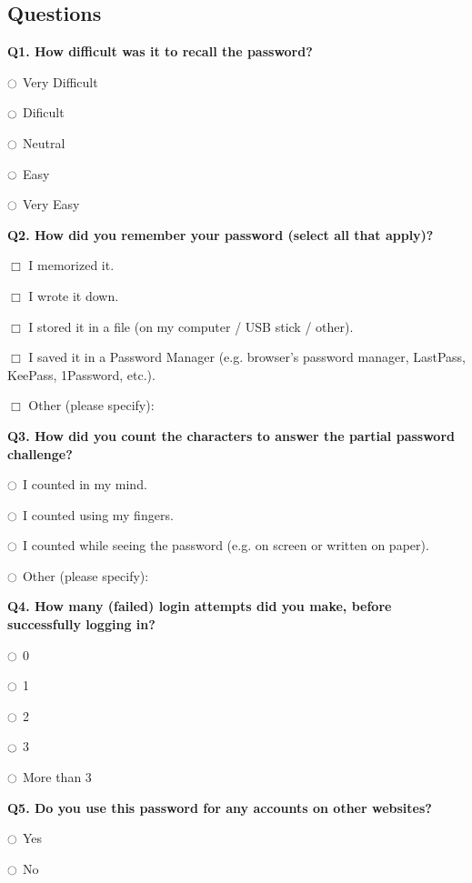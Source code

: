     \subsection{Questions}
    \label{apss:memorability_questions}
    {\setmainfont[Mapping=TeX-text,Ligatures=TeX]{Helvetica}
    \textbf{Q1. How difficult was it to recall the password?}
    \begin{shortitemize}
      \item[$\ocircle$] Very Difficult
      \item[$\ocircle$] Dificult
      \item[$\ocircle$] Neutral
      \item[$\ocircle$] Easy
      \item[$\ocircle$] Very Easy
    \end{shortitemize}

    \textbf{Q2. How did you remember your password (select all that apply)?}
    \begin{shortitemize}
      \item[$\Box$] I memorized it.
      \item[$\Box$] I wrote it down.
      \item[$\Box$] I stored it in a file (on my computer / USB stick / other).
      \item[$\Box$] I saved it in a Password Manager (e.g. browser's password manager, LastPass, KeePass, 1Password, etc.).
      \item[$\Box$] Other (please specify): \ovalbox{\phantom{A box for some explanation goes here}}
    \end{shortitemize}

    \textbf{Q3. How did you count the characters to answer the partial password challenge?}
    \begin{shortitemize}
      \item[$\ocircle$] I counted in my mind.
      \item[$\ocircle$] I counted using my fingers.
      \item[$\ocircle$] I counted while seeing the password (e.g. on screen or written on paper).
      \item[$\ocircle$] Other (please specify): \ovalbox{\phantom{A box for some explanation goes here}}
    \end{shortitemize}

    \textbf{Q4. How many (failed) login attempts did you make, before successfully logging in?}
    \begin{shortitemize}
      \item[$\ocircle$] 0
      \item[$\ocircle$] 1
      \item[$\ocircle$] 2
      \item[$\ocircle$] 3
      \item[$\ocircle$] More than 3
    \end{shortitemize}

    \textbf{Q5. Do you use this password for any accounts on other websites?}
    \begin{shortitemize}
      \item[$\ocircle$] Yes
      \item[$\ocircle$] No
    \end{shortitemize}
    }